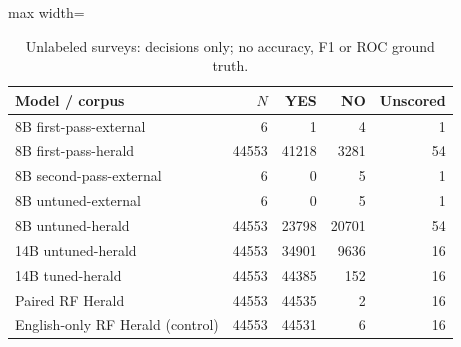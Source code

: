 \begin{table}[htbp]
\centering
\caption{Unlabeled surveys: decisions only; no accuracy, F1 or ROC ground truth.}
\label{tab:unlabeled}
\small
\begin{adjustbox}{max width=\textwidth}
\begin{tabular}{lrrrr}
\toprule
Model / corpus & $N$ & YES & NO & Unscored \\
\midrule
8B first-pass-external & 6 & 1 & 4 & 1 \\
8B first-pass-herald & 44553 & 41218 & 3281 & 54 \\
8B second-pass-external & 6 & 0 & 5 & 1 \\
8B untuned-external & 6 & 0 & 5 & 1 \\
8B untuned-herald & 44553 & 23798 & 20701 & 54 \\
14B untuned-herald & 44553 & 34901 & 9636 & 16 \\
14B tuned-herald & 44553 & 44385 & 152 & 16 \\
Paired RF Herald & 44553 & 44535 & 2 & 16 \\
English-only RF Herald (control) & 44553 & 44531 & 6 & 16 \\
\bottomrule
\end{tabular}
\end{adjustbox}
\end{table}
